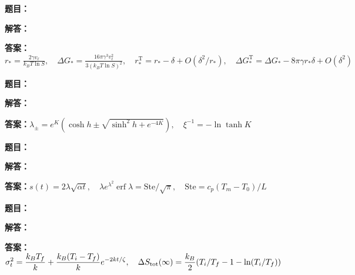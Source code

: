 \documentclass[lang=cn,color=blue,11pt]{elegantbook}
\begin{document}
\par
\noindent\textbf{题目：}
\par\noindent\textbf{解答：}
\par\noindent\textbf{答案：}\(\displaystyle r_*=\frac{2\gamma v_\ell}{k_BT\ln S},\quad \Delta G_*=\frac{16\pi\gamma^3v_\ell^2}{3(k_BT\ln S)^2},\quad r_*^{\mathrm T}=r_*-\delta+O(\delta^2/r_*),\quad \Delta G_*^{\mathrm T}=\Delta G_*-8\pi\gamma r_*\delta+O(\delta^2)\)\par
\par\smallskip\noindent\hrulefill\par\medskip
{}\par
\noindent\textbf{题目：}
\par\noindent\textbf{解答：}
\par\noindent\textbf{答案：}\(\displaystyle \lambda_\pm=e^K(\cosh h\pm\sqrt{\sinh^2h+e^{-4K}}),\quad\xi^{-1}=-\ln\tanh K\)\par
\par\smallskip\noindent\hrulefill\par\medskip
{}\par
\noindent\textbf{题目：}
\par\noindent\textbf{解答：}
\par\noindent\textbf{答案：}\(\displaystyle s(t)=2\lambda\sqrt{\alpha t},\quad\lambda e^{\lambda^2}\operatorname{erf}\lambda=\mathrm{Ste}/\sqrt{\pi},\quad \mathrm{Ste}=c_p(T_m-T_0)/L\)\par
\par\smallskip\noindent\hrulefill\par\medskip
{}\par
\noindent\textbf{题目：}
\par\noindent\textbf{解答：}
\par\noindent\textbf{答案：}\(\displaystyle \sigma_t^2=\frac{k_BT_f}{k}+\frac{k_B(T_i-T_f)}{k}e^{-2kt/\zeta},\quad\Delta S_{\rm tot}(\infty)=\frac{k_B}{2}(T_i/T_f-1-\ln(T_i/T_f))\)\par
\end{document}
